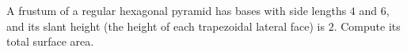 A frustum of a regular hexagonal pyramid has bases with side lengths $4$ and $6$, and its slant height (the height of each trapezoidal lateral face) is $2$. Compute its total surface area.
